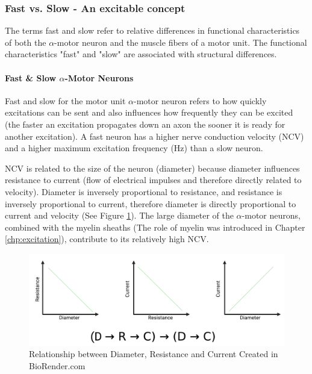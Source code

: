 \subsubsection{Fast vs. Slow - An excitable concept}

The terms fast and slow refer to relative differences in functional characteristics of both the $\alpha$-motor neuron and the muscle fibers of a motor unit. The functional characteristics "fast" and "slow" are associated with structural differences. 

\paragraph{Fast \& Slow $\alpha$-Motor Neurons}
Fast and slow for the motor unit $\alpha$-motor neuron refers to how quickly excitations can be sent and also influences how frequently they can be excited (the faster an excitation propagates down an axon the sooner it is ready for another excitation). A fast neuron has a higher nerve conduction velocity (NCV) and a higher maximum excitation frequency (Hz) than a slow neuron.

NCV is related to the size of the neuron (diameter) because diameter influences resistance to current (flow of electrical impulses and therefore directly related to velocity). Diameter is inversely proportional to resistance, and resistance is inversely proportional to current, therefore diameter is directly proportional to current and velocity (See Figure \ref{fig:Current_Resistance}). The large diameter of the $\alpha$-motor neurons, combined with the myelin sheaths (The role of myelin was introduced in Chapter \ref{chp:excitation}), contribute to its relatively high NCV. 

\begin{figure}[!ht]
    \centering
    \includegraphics[width=1\linewidth]{./figure/Current_Resistance.png}
    \caption{Relationship between Diameter, Resistance and Current \footnotesize{Created in BioRender.com}}
    \label{fig:Current_Resistance}
\end{figure}

